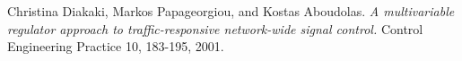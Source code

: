 \documentclass[11pt]{article}
\begin{document}
\begin{thebibliography}{9}
Christina Diakaki, Markos Papageorgiou, and Kostas Aboudolas.
\textit{A multivariable regulator approach to traffic-responsive network-wide signal control.}
Control Engineering Practice 10, 183-195, 2001.

\end{thebibliography}

\end{document}
